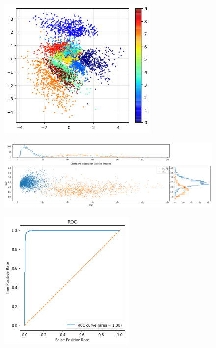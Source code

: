\begin{figure}
    \centering
    \includegraphics[width=0.7\textwidth]{images/mnist_2d}
    \caption{}
    \label{fig:mnist_2d}
\end{figure}

\begin{figure}
    \centering
    \includegraphics[width=1.0\textwidth]{images/mnist_compare}
    \caption{}
    \label{fig:mnist_compare}
\end{figure}

\begin{figure}
    \centering
    \includegraphics[width=0.6\textwidth]{images/mnist_roc}
    \caption{}
    \label{fig:mnist_roc}
\end{figure}

